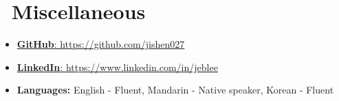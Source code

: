 \documentclass{resume}
\begin{document}
\section{\faInfo\ Miscellaneous}
\begin{itemize}[parsep=0.5ex]
  \item \href{https://github.com/jishen027}{\textbf{GitHub}: https://github.com/jishen027}
  \item \href{https://www.linkedin.com/in/jeblee}{\textbf{LinkedIn}: https://www.linkedin.com/in/jeblee} 
  \item \textbf{Languages:} English - Fluent, Mandarin - Native speaker, Korean - Fluent
\end{itemize}




%
%
\end{document}
